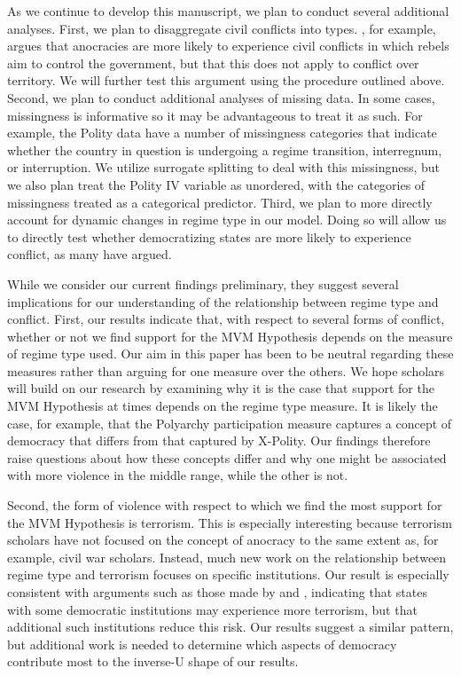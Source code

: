 \documentclass[titlepage, onecolumn,12pt]{article}
\begin{document}
As we continue to develop this manuscript, we plan to conduct several additional analyses.  First, we plan to disaggregate civil conflicts into types.  \citet{buhaug2006relative}, for example, argues that anocracies are more likely to experience civil conflicts in which rebels aim to control the government, but that this does not apply to conflict over territory.  We will further test this argument using the procedure outlined above.  Second, we plan to conduct additional analyses of missing data.  In some cases, missingness is informative so it may be advantageous to treat it as such. For example, the Polity data have a number of missingness categories that indicate whether the country in question is undergoing a regime transition, interregnum, or interruption. We utilize surrogate splitting to deal with this missingness, but we also plan treat the Polity IV variable as unordered, with the categories of missingness treated as a categorical predictor.  Third, we plan to more directly account for dynamic changes in regime type in our model.  Doing so will allow us to directly test whether democratizing states are more likely to experience conflict, as many have argued.

While we consider our current findings preliminary, they suggest several implications for our understanding of the relationship between regime type and conflict.  First, our results indicate that, with respect to several forms of conflict, whether or not we find support for the MVM Hypothesis depends on the measure of regime type used.  Our aim in this paper has been to be neutral regarding these measures rather than arguing for one measure over the others.  We hope scholars will build on our research by examining why it is the case that support for the MVM Hypothesis at times depends on the regime type measure.  It is likely the case, for example, that the Polyarchy participation measure captures a concept of democracy that differs from that captured by X-Polity.  Our findings therefore raise questions about how these concepts differ and why one might be associated with more violence in the middle range, while the other is not.

Second, the form of violence with respect to which we find the most support for the MVM Hypothesis is terrorism.  This is especially interesting because terrorism scholars have not focused on the concept of anocracy to the same extent as, for example, civil war scholars.  Instead, much new work on the relationship between regime type and terrorism focuses on specific institutions.  Our result is especially consistent with arguments such as those made by
\citet{aksoy2012terrorism} and \citet{aksoy2014electoral}, indicating that states with some democratic institutions may experience more terrorism, but that additional such institutions reduce this risk.  Our results suggest a similar pattern, but additional work is needed to determine which aspects of democracy contribute most to the inverse-U shape of our results.
\end{document}
